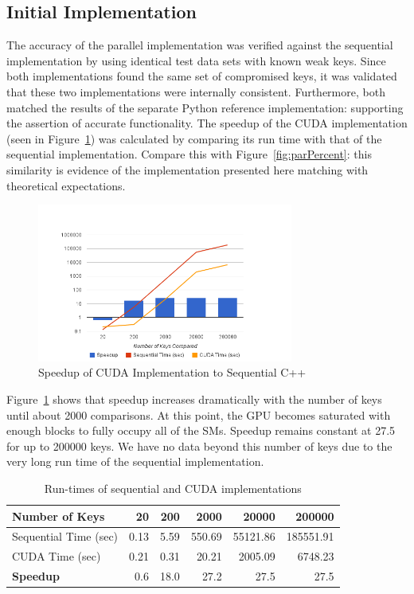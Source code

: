 \documentclass[smallextended]{svjour3}       %
\begin{document}
\subsection{Initial Implementation}
\label{subsec:initimpl}
The accuracy of the parallel implementation was verified against the 
sequential implementation by using identical test data sets with known 
weak keys. Since both implementations found the same set of compromised keys,
it was validated that these two implementations 
were internally consistent. Furthermore, both matched the results of the 
separate Python reference implementation: supporting the assertion of accurate 
functionality. The speedup of the CUDA implementation (seen in
Figure~\ref{fig:speedup}) was calculated by comparing its run time with that
of the sequential implementation. Compare this with Figure~\ref{fig:parPercent}:
this similarity is evidence of the implementation presented here matching
with theoretical expectations.

\begin{figure}
   \centering
   \includegraphics[width=0.75\textwidth]{chart_1}
   \caption{Speedup of CUDA Implementation to Sequential C++}
   \label{fig:speedup}
\end{figure}

Figure~\ref{fig:speedup} shows that speedup increases dramatically with 
the number of keys until about 2000 comparisons. At this point, the GPU
becomes saturated with enough blocks to fully occupy all of the SMs. Speedup
remains constant at 27.5 for up to 200000 keys. We have no data beyond this
number of keys due to the very long run time of the sequential implementation. 

\begin{table}
   \centering
   \begin{tabular}{|l|*{5}{r}|}\hline
      Number of Keys        & 20   & 200  & 2000   & 20000    & 200000 \\ \hline
      Sequential Time (sec) & 0.13 & 5.59 & 550.69 & 55121.86 & 185551.91\\
      CUDA Time (sec)       & 0.21 & 0.31 & 20.21  & 2005.09  & 6748.23\\\hline
      \textbf{Speedup}      & 0.6  & 18.0 & 27.2   & 27.5     & 27.5\\\hline
   \end{tabular}
   \caption{Run-times of sequential and CUDA implementations}
   \label{tab:runtimes}
\end{table}
\end{document}
